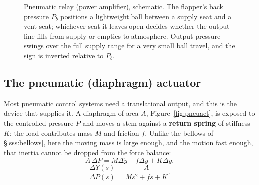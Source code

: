 \documentclass[11pt,a4paper]{article}
\begin{document}
\begin{figure}[H]
\centering
{}
\caption{Pneumatic relay (power amplifier), schematic. The flapper's back
pressure $P_b$ positions a lightweight ball between a supply seat and a vent
seat; whichever seat it leaves open decides whether the output line fills
from supply or empties to atmosphere. Output pressure swings over the full
supply range for a very small ball travel, and the sign is inverted relative
to $P_b$.}
\label{fig:relay}
\end{figure}

\subsection{The pneumatic (diaphragm) actuator}
\label{sss:diaphragm}

Most pneumatic control systems need a translational output, and this is the
device that supplies it. A diaphragm of area $A$, Figure~\ref{fig:pneuact},
is exposed to the controlled pressure $P$ and moves a stem against a
\textbf{return spring} of stiffness $K$; the load contributes mass $M$ and
friction $f$. Unlike the bellows of \S\ref{sss:bellows}, here the moving mass
is large enough, and the motion fast enough, that inertia cannot be dropped
from the force balance:
\[
  A\,\Delta P = M\Delta\ddot y + f\Delta\dot y + K\Delta y .
\]
\begin{equation}
  \frac{\Delta Y(s)}{\Delta P(s)}=\frac{A}{Ms^{2}+fs+K}.
  \label{eq:pneuact}
\end{equation}
\end{document}
